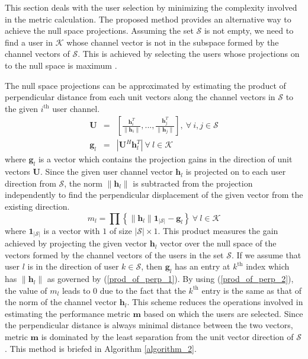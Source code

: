 This section deals with the user selection by minimizing the complexity involved in the metric calculation. The proposed method provides an alternative way to achieve the null space projections. Assuming the set $\mathcal{S}$ is not empty, we need to find a user in $\mathcal{K}$ whose channel vector is not in the subspace formed by the channel vectors of $\mathcal{S}$. This is achieved by selecting the users whose projections on to the null space is maximum \cite{traniterative,zhang2007user,sun2009eigenmode}.

The null space projections can be approximated by estimating the product of perpendicular distance from each unit vectors along the channel vectors in $\mathcal{S}$ to the given $i^{\mathrm{th}}$ user channel.
\begin{eqnarray}
\mathbf{U} &=& \left [ \frac{\mathbf{h}^T_i}{\|\mathbf{h}_i\|},...,\frac{\mathbf{h}^T_j}{\|\mathbf{h}_j\|}  \right ], \ \forall \ i,j \in \mathcal{S} \\
\mathbf{g}_l &=& |\mathbf{U}^H \mathbf{h}^T_l| \ \forall \ l \in \mathcal{K}
\label{prod_of_perp_1}
\end{eqnarray}
where $\mathbf{g}_l$ is a vector which contains the projection gains in the direction of unit vectors $\mathbf{U}$. Since the given user channel vector $\mathbf{h}_l$ is projected on to each user direction from $\mathcal{S}$, the norm $\|\mathbf{h}_l\|$ is subtracted from the projection independently to find the perpendicular displacement of the given vector from the existing direction.
\begin{equation}
m_l = \displaystyle \prod \left \lbrace \|\mathbf{h}_l\| \mathbf{1}_{|\mathcal{S}|} - \mathbf{g}_l \right \rbrace \ \forall \ l \in \mathcal{K}
\label{prod_of_perp_2}
\end{equation}
where $\mathbf{1}_{|\mathcal{S}|}$ is a vector with $1$ of size $|\mathcal{S}| \times 1$. This product measures the gain achieved by projecting the given vector $\mathbf{h}_l$ vector over the null space of the vectors formed by the channel vectors of the users in the set $\mathcal{S}$. If we assume that user $l$ is in the direction of user $k \in \mathcal{S}$, then $\mathbf{g}_l$ has an entry at $k^{\mathrm{th}}$ index which has $\|\mathbf{h}_l\|$ as governed by (\ref{prod_of_perp_1}). By using (\ref{prod_of_perp_2}), the value of $m_l$ leads to $0$ due to the fact that the $k^{\mathrm{th}}$ entry is the same as that of the norm of the channel vector $\mathbf{h}_l$. This scheme reduces the operations involved in estimating the performance metric $\mathbf{m}$ based on which the users are selected. Since the perpendicular distance is always minimal distance between the two vectors, metric $\mathbf{m}$ is dominated by the least separation from the unit vector direction of $\mathcal{S}$. This method is briefed in Algorithm \ref{algorithm_2}.


